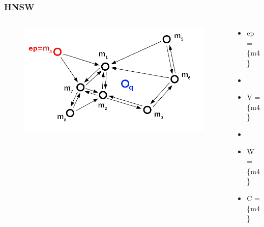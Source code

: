 \documentclass{beamer}
\begin{document}
	\begin{frame}
		\frametitle{HNSW}
		
		\begin{columns}[T] %
			\begin{column}{.6\textwidth}
				\begin{figure}
					\includegraphics[scale=0.3]{figures/HNSW_b2.png}
				\end{figure}
			\end{column}%
			\hfill%
			\begin{column}{.4\textwidth}
				\begin{itemize}
					\item ep = \{m4\}
					\item[]
					\item V = \{m4\}
					\item[]
					\item W = \{m4\}
					\item C = \{m4\}
				\end{itemize}
			\end{column}%
		\end{columns}
		
	\end{frame}
\end{document}
